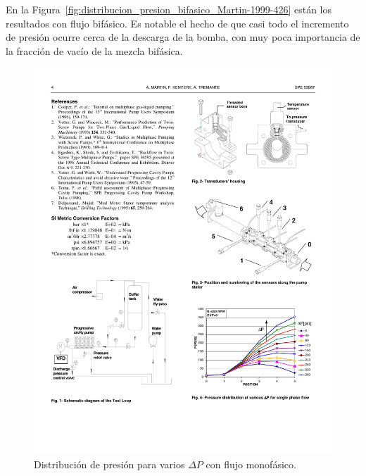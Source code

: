 En la Figura~\ref{fig:distribucion_presion_bifasico_Martin-1999-426} están los resultados con flujo bifásico. Es notable el hecho de que casi todo el incremento de presión ocurre cerca de la descarga de la bomba, con muy poca importancia de la fracción de vacío de la mezcla bifásica. 


 
\begin{figure}

\centering
		
\includegraphics[scale=1,draft=false]{distribucion_presion_Martin-1999-426} 


\caption{Distribución de presión para varios $\Delta P$ con flujo monofásico.}

\label{fig:distribucion_presion_Martin-1999-426}

\end{figure}



